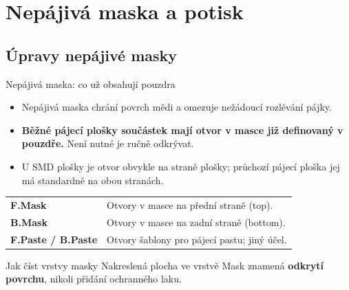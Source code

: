 \documentclass{beamer}
\begin{document}
\section{\texorpdfstring{Nepájivá maska a potisk}{Nepajiva maska a potisk}}
\subsection{\texorpdfstring{Úpravy nepájivé masky}{Upravy nepajive masky}}
\begin{frame}[t]{Nepájivá maska: co už obsahují pouzdra}
	\begin{itemize}
		\item Nepájivá maska chrání povrch mědi a omezuje nežádoucí rozlévání pájky.
		\item \textbf{Běžné pájecí plošky součástek mají otvor v masce již definovaný v pouzdře.} Není nutné je ručně odkrývat.
		\item U SMD plošky je otvor obvykle na straně plošky; průchozí pájecí ploška jej má standardně na obou stranách.
	\end{itemize}
	\begin{center}
		\begin{tabular}{ll}
			\textbf{F.Mask} & Otvory v masce na přední straně (top). \\
			\textbf{B.Mask} & Otvory v masce na zadní straně (bottom). \\
			\textbf{F.Paste / B.Paste} & Otvory šablony pro pájecí pastu; jiný účel. \\
		\end{tabular}
	\end{center}
	\begin{block}{Jak číst vrstvy masky}
	Nakreslená plocha ve vrstvě Mask znamená \textbf{odkrytí povrchu}, nikoli přidání ochranného laku.
	\end{block}
\end{frame}
\end{document}
